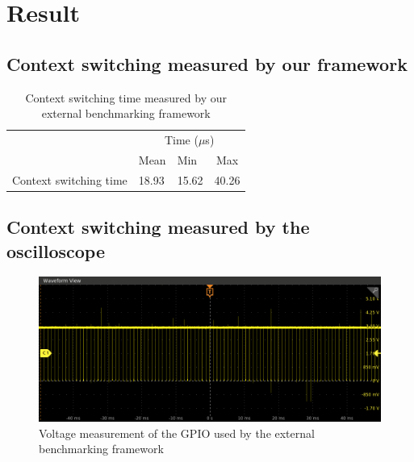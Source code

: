 \section{Result}

\subsection{Context switching measured by our framework}


\begin{table}[!ht]
  \centering
  \begin{tabular}{llll}
                        & \multicolumn{3}{c}{Time ($\mu$s)}                             \\ \cline{2-4} 
                        & \multicolumn{1}{c}{Mean} & Min  & \multicolumn{1}{c}{Max} \\ \cline{2-4} 
  Context switching time & 18.93                     & 15.62 & 40.26                    \\
  \end{tabular}
  \caption{Context switching time measured by our external benchmarking framework}
  \label{tab:external-framework-measurement}
\end{table}

\subsection{Context switching measured by the oscilloscope}

\begin{figure}[!ht]
  \centering
  \includegraphics[scale=0.5]{assets/external-framework-value-wave.png}
  \caption{\label{fig:external-framework-value-wave}Voltage measurement of the GPIO used by the external benchmarking framework}
\end{figure}


